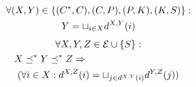 \begin{multline}
\forall (X,Y) \in  \{ ({C^{*}},{C}), ({C},{P}), ({P},{K}), ({K},{S}) \}: \\
Y=\sqcup_{i \in X}d^{X,Y}(i) \label{model:hierarchy}
\end{multline}
\begin{multline}
\forall X,Y,Z \in {\TYPE}\cup\myset{\SESSION}:\\
\mbox{\hspace{-10em}}X\preceq^{*} Y\preceq^{*} Z 
\Rightarrow \\
(\forall i \in X:
\map{X}{Z}{i}=\setpartition{j}{\map{X}{Y}{i}}{\map{Y}{Z}{j}}
 \label{model:transitivity})
\end{multline}

